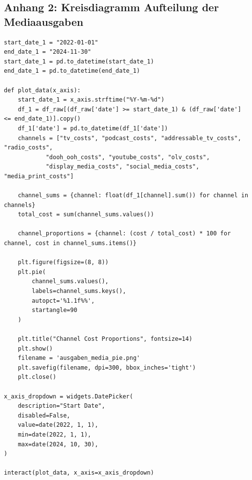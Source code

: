 \documentclass{common/nak}
\numberwithin{equation}{subsection}
\begin{document}
\subsection*{Anhang 2: Kreisdiagramm Aufteilung der Mediaausgaben}
\label{Anhang2KreisdiagrammAufteilungDerMediaausgaben}
\begin{lstlisting}
start_date_1 = "2022-01-01"
end_date_1 = "2024-11-30"
start_date_1 = pd.to_datetime(start_date_1)
end_date_1 = pd.to_datetime(end_date_1)

def plot_data(x_axis):
    start_date_1 = x_axis.strftime("%Y-%m-%d")
    df_1 = df_raw[(df_raw['date'] >= start_date_1) & (df_raw['date'] <= end_date_1)].copy() 
    df_1['date'] = pd.to_datetime(df_1['date'])
    channels = ["tv_costs", "podcast_costs", "addressable_tv_costs", "radio_costs", 
            "dooh_ooh_costs", "youtube_costs", "olv_costs", 
            "display_media_costs", "social_media_costs", "media_print_costs"]

    channel_sums = {channel: float(df_1[channel].sum()) for channel in channels}
    total_cost = sum(channel_sums.values())

    channel_proportions = {channel: (cost / total_cost) * 100 for channel, cost in channel_sums.items()}

    plt.figure(figsize=(8, 8))
    plt.pie(
        channel_sums.values(),
        labels=channel_sums.keys(),
        autopct='%1.1f%%',
        startangle=90
    )

    plt.title("Channel Cost Proportions", fontsize=14)
    plt.show()
    filename = 'ausgaben_media_pie.png'
    plt.savefig(filename, dpi=300, bbox_inches='tight')
    plt.close() 

x_axis_dropdown = widgets.DatePicker(
    description="Start Date",
    disabled=False,
    value=date(2022, 1, 1),
    min=date(2022, 1, 1),  
    max=date(2024, 10, 30),
)

interact(plot_data, x_axis=x_axis_dropdown)
\end{lstlisting}

\newpage
\end{document}
